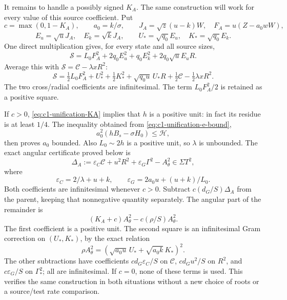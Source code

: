 It remains to handle a possibly signed $K_A$. The same construction
will work for every value of this source coefficient. Put
\[
 c=\max(0,1-K_A),\qquad a_0=k/\sigma,\qquad
 J_A=\sqrt z(u-k)W,\quad F_A=u(Z-a_0wW),
\]
\[
 E_u=\sqrt uJ_A,\quad E_k=\sqrt kJ_A,\qquad
 U_* =\sqrt{q_0}E_u,\quad K_* =\sqrt{q_0}E_k.
\]
One direct multiplication gives, for every state and all source sizes,
\begin{equation}\label{eq:c1-unification-US}
 \mathscr S=L_0F_A^2+2q_0E_u^2+q_0E_k^2
                                  +2q_0\sqrt uE_uR.
\end{equation}
Average this with $\mathscr S=\mathscr C-\lambda xR^2$:
\[
 \mathscr S=\tfrac12L_0F_A^2+U_*^2+\tfrac12K_*^2
 +\sqrt{q_0u}\,U_*R+\tfrac12\mathscr C-\tfrac12\lambda xR^2.
\]
The two cross/radial coefficients are infinitesimal. The term
$L_0F_A^2/2$ is retained as a positive square.

If $c>0$, \eqref{eq:c1-unification-KA} implies that $h$ is a positive
unit: in fact its residue is at least $1/4$. The inequality obtained
from \eqref{eq:c1-unification-e-bound},
\[
 a_0^2(hB_s-\sigma H_0)\le\mathcal H,
\]
then proves $a_0$ bounded. Also $L_0\sim2h$ is a positive unit,
so $\lambda$ is unbounded. The exact angular certificate proved
below is
\begin{equation}\label{eq:c1-unification-angular-budget}
 \Delta_A:=\varepsilon_C\mathscr C+u^2R^2
                         +\varepsilon_G\Gamma^2-A_\theta^2\in\Sigma T^2,
\end{equation}
where
\[
 \varepsilon_C=2/\lambda+u+k,\qquad
 \varepsilon_G=2a_0u+(u+k)/L_0.
\]
Both coefficients are infinitesimal whenever $c>0$. Subtract
$c(d_G/S)\Delta_A$ from the parent, keeping that nonnegative
quantity separately. The angular part of the remainder is
\[
 (K_A+c)A_\theta^2-c(\rho/S)A_\theta^2.
\]
The first coefficient is a positive unit. The second square is an
infinitesimal Gram correction on $(U_*,K_*)$, by the exact relation
\begin{equation}\label{eq:c1-unification-weighted-angular}
 \rho A_\theta^2=
       (\sqrt{a_0u}\,U_*+\sqrt{a_0k}\,K_*)^2.
\end{equation}
The other subtractions have coefficients
$c d_G\varepsilon_C/S$ on $\mathscr C$,
$c d_Gu^2/S$ on $R^2$, and $c\varepsilon_G/S$ on $\Gamma_*^2$;
all are infinitesimal. If $c=0$, none of these terms is used.
This verifies the same construction in both situations without a
new choice of roots or a source/test rate comparison.

